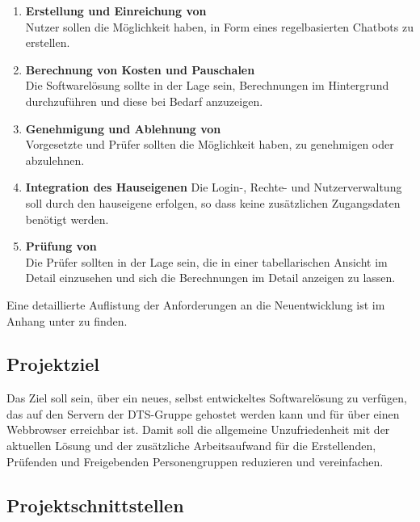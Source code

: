\begin{enumerate}
    \item \textbf{Erstellung und Einreichung von }\\
    Nutzer sollen die Möglichkeit haben,  in Form eines regelbasierten Chatbots zu erstellen.
    \item \textbf{Berechnung von Kosten und Pauschalen}\\
    Die Softwarelösung sollte in der Lage sein, Berechnungen im Hintergrund durchzuführen und diese bei Bedarf anzuzeigen.
    \item \textbf{Genehmigung und Ablehnung von }\\
    Vorgesetzte und Prüfer sollten die Möglichkeit haben,  zu genehmigen oder abzulehnen.
    \item \textbf{Integration des Hauseigenen }
    Die Login-, Rechte- und Nutzerverwaltung soll durch den hauseigene  erfolgen, so dass keine zusätzlichen Zugangsdaten benötigt werden.
    \item \textbf{Prüfung von }\\
    Die Prüfer sollten in der Lage sein, die  in einer tabellarischen Ansicht im Detail einzusehen und sich die Berechnungen im Detail anzeigen zu lassen.
\end{enumerate}

Eine detaillierte Auflistung der Anforderungen an die Neuentwicklung ist im Anhang unter  zu finden.


\subsection{Projektziel}
\label{sec:Einführung-Definitionsphase:Projektziel}

Das Ziel soll sein, über ein neues, selbst entwickeltes Softwarelösung zu verfügen, das auf den Servern der DTS-Gruppe gehostet werden kann und für  über einen Webbrowser erreichbar ist. Damit soll die allgemeine Unzufriedenheit mit der aktuellen Lösung und der zusätzliche Arbeitsaufwand für die Erstellenden, Prüfenden und Freigebenden Personengruppen reduzieren und vereinfachen.

\subsection{Projektschnittstellen}
\label{sec:Einführung-Definitionsphase:Projektschnittstellen}

